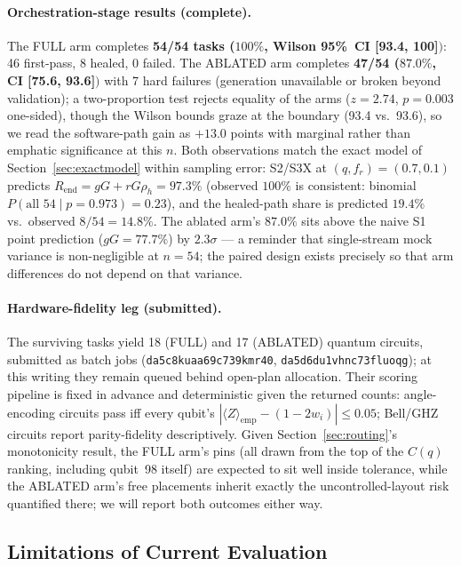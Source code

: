 ﻿\documentclass[12pt,a4paper]{article}
\begin{document}
\paragraph{Orchestration-stage results (complete).} The FULL arm completes \textbf{54/54 tasks ($100\%$, Wilson 95\%~CI [93.4, 100]$)$}: 46 first-pass, 8 healed, 0 failed. The ABLATED arm completes \textbf{47/54 ($87.0\%$, CI [75.6, 93.6]$)$} with 7 hard failures (generation unavailable or broken beyond validation); a two-proportion test rejects equality of the arms ($z = 2.74$, $p = 0.003$ one-sided), though the Wilson bounds graze at the boundary (93.4 vs.\ 93.6), so we read the software-path gain as $+13.0$ points with marginal rather than emphatic significance at this $n$. Both observations match the exact model of Section~\ref{sec:exactmodel} within sampling error: S2/S3X at $(q, f_r) = (0.7, 0.1)$ predicts $R_{\mathrm{end}} = gG + rG\rho_h = 97.3\%$ (observed $100\%$ is consistent: binomial $P(\text{all } 54 \mid p{=}0.973) = 0.23$), and the healed-path share is predicted $19.4\%$ vs.\ observed $8/54 = 14.8\%$. The ablated arm's $87.0\%$ sits above the naive S1 point prediction ($gG = 77.7\%$) by $2.3\sigma$ --- a reminder that single-stream mock variance is non-negligible at $n{=}54$; the paired design exists precisely so that arm differences do not depend on that variance.

\paragraph{Hardware-fidelity leg (submitted).} The surviving tasks yield 18 (FULL) and 17 (ABLATED) quantum circuits, submitted as batch jobs (\texttt{da5c8kuaa69c739kmr40}, \texttt{da5d6du1vhnc73fluoqg}); at this writing they remain queued behind open-plan allocation. Their scoring pipeline is fixed in advance and deterministic given the returned counts: angle-encoding circuits pass iff every qubit's $|\langle Z\rangle_{\mathrm{emp}} - (1 - 2w_i)| \le 0.05$; Bell/GHZ circuits report parity-fidelity descriptively. Given Section~\ref{sec:routing}'s monotonicity result, the FULL arm's pins (all drawn from the top of the $C(q)$ ranking, including qubit~98 itself) are expected to sit well inside tolerance, while the ABLATED arm's free placements inherit exactly the uncontrolled-layout risk quantified there; we will report both outcomes either way.

\subsection{Limitations of Current Evaluation}
\end{document}
